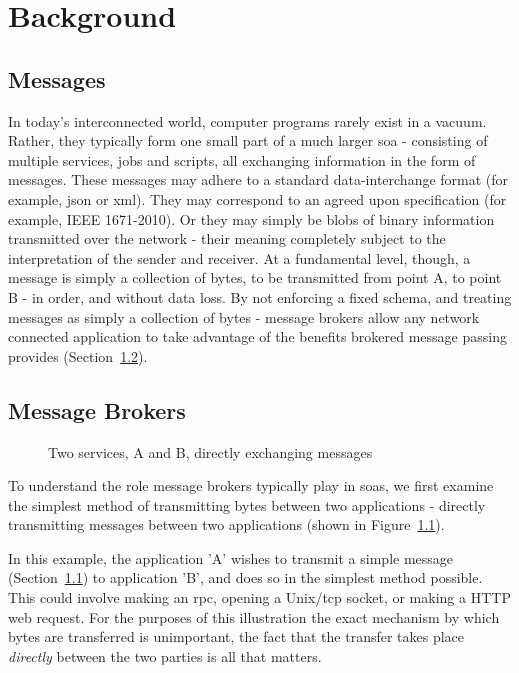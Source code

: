\chapter{Background}
\label{chap:Background}

\section{Messages}
\label{sec:messages}

In today's interconnected world, computer programs rarely exist in a vacuum.
Rather, they typically form one small part of a much larger \gls{soa} -
consisting of multiple services, jobs and scripts, all exchanging information in
the form of messages. These messages may adhere to a standard data-interchange
format (for example, \gls{json} or \gls{xml}). They may correspond to an agreed
upon specification (for example, IEEE 1671-2010\cite{atml}). Or they may simply
be blobs of binary information transmitted over the network - their meaning
completely subject to the interpretation of the sender and receiver. At a
fundamental level, though, a message is simply a collection of bytes, to be
transmitted from point A, to point B - in order, and without data loss. By not
enforcing a fixed schema, and treating messages as simply a collection of bytes -
message brokers allow any network connected application to take advantage of the
benefits brokered message passing provides (Section~\ref{sec:brokers}).

\section{Message Brokers}
\label{sec:brokers}

\begin{figure}[htbp]
  \centering
  
  \caption{Two services, A and B, directly exchanging messages}
  \label{fig:tikz:directMessaging}
\end{figure}

To understand the role message brokers typically play in \glspl{soa}, we first
examine the simplest method of transmitting bytes between two applications -
directly transmitting messages between two applications (shown in
Figure~\ref{fig:tikz:directMessaging}).

In this example, the application 'A' wishes to transmit a simple message
(Section~\ref{sec:messages}) to application 'B', and does so in the simplest
method possible. This could involve making an \gls{rpc}, opening a
Unix/\gls{tcp} socket, or making a HTTP web request. For the purposes of this
illustration the exact mechanism by which bytes are transferred is unimportant,
the fact that the transfer takes place \emph{directly} between the two parties
is all that matters.

